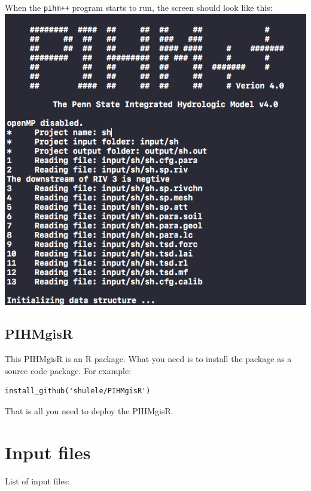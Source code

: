\documentclass[]{scrbook}
\begin{document}
When the \texttt{pihm++} program starts to run, the screen should look
like this: \includegraphics{Fig/CLI_SH.png}

\section{PIHMgisR}\label{pihmgisr}

This PIHMgisR is an R package. What you need is to install the package
as a source code package. For example:

\begin{verbatim}
install_github('shulele/PIHMgisR')
\end{verbatim}

That is all you need to deploy the PIHMgisR.

\chapter{Input files}\label{input-files}

List of input files:
\end{document}

